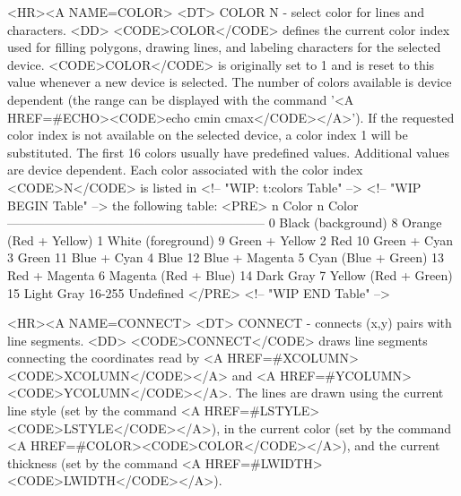\begin{rawhtml}
<HR><A NAME=COLOR>
<DT>
COLOR N - select color for lines and characters.
<DD>
	<CODE>COLOR</CODE> defines the current color index used for
	filling polygons, drawing lines, and labeling characters for
	the selected device.  <CODE>COLOR</CODE> is originally set to 1
	and is reset to this value whenever a new device is selected.
	The number of colors available is device dependent (the range
	can be displayed with the command
	'<A HREF=#ECHO><CODE>echo cmin cmax</CODE></A>').  If the
	requested color index is not available on the selected device,
	a color index 1 will be substituted.  The first 16 colors
	usually have predefined values.  Additional values are device
	dependent.  Each color associated with the color index
	<CODE>N</CODE> is listed in
<!-- "WIP: t:colors Table" -->
<!-- "WIP BEGIN Table" -->
	the following table:
	<PRE>
   n    Color                     n     Color
--------------------------------------------------------------
   0    Black (background)        8     Orange (Red + Yellow)
   1    White (foreground)        9     Green + Yellow
   2    Red                      10     Green + Cyan
   3    Green                    11     Blue + Cyan
   4    Blue                     12     Blue + Magenta
   5    Cyan (Blue + Green)      13     Red + Magenta
   6    Magenta (Red + Blue)     14     Dark Gray
   7    Yellow (Red + Green)     15     Light Gray
                                 16-255 Undefined
	</PRE>
<!-- "WIP END Table" -->

<HR><A NAME=CONNECT>
<DT>
CONNECT - connects (x,y) pairs with line segments.
<DD>
	<CODE>CONNECT</CODE> draws line segments connecting the
	coordinates read by <A HREF=#XCOLUMN><CODE>XCOLUMN</CODE></A>
	and <A HREF=#YCOLUMN><CODE>YCOLUMN</CODE></A>.  The lines are
	drawn using the current line style (set by the command
	<A HREF=#LSTYLE><CODE>LSTYLE</CODE></A>), in the current color
	(set by the command <A HREF=#COLOR><CODE>COLOR</CODE></A>), and
	the current thickness (set by the command
	<A HREF=#LWIDTH><CODE>LWIDTH</CODE></A>).


\end{rawhtml}
